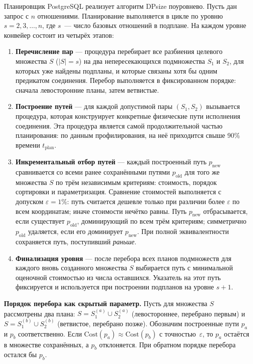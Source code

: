 Планировщик PostgreSQL реализует алгоритм DPsize поуровнево.
Пусть дан запрос с $n$ отношениями. Планирование выполняется в цикле по
уровню $s = 2, 3, \ldots, n$, где $s$~--- число базовых отношений в подплане.
На каждом уровне конвейер состоит из четырёх этапов:
\begin{enumerate}
    \item \textbf{Перечисление пар} --- процедура перебирает все разбиения
    целевого множества $S$ ($|S| = s$) на два непересекающихся подмножества
    $S_1$ и $S_2$, для которых уже найдены подпланы, и которые связаны хотя бы одним
    предикатом соединения. Перебор выполняется в фиксированном порядке:
    сначала левосторонние планы, затем ветвистые.

    \item \textbf{Построение путей} --- для каждой допустимой пары $(S_1, S_2)$
    вызывается процедура, которая конструирует конкретные физические
    пути исполнения соединения. 
    Эта процедура является самой продолжительной частью планирования: по данным профилирования,
    на неё приходится свыше 90\% времени $t_{\mathrm{plan}}$.

    \item \textbf{Инкрементальный отбор путей} --- каждый построенный путь $p_{\text{new}}$
    сравнивается со всеми ранее сохранёнными путями $p_{\text{old}}$ для того же
    множества $S$ по трём независимым критериям: стоимость,
    порядок сортировки и параметризация.
    Сравнение стоимостей выполняется с допуском $\varepsilon = 1\%$: путь считается
    дешевле только при различии более $\varepsilon$ по всем координатам; иначе
    стоимости нечётко равны.
    Путь $p_{\text{new}}$ отбрасывается, если существует $p_{\text{old}}$,
    доминирующий по всем трём критериям; симметрично $p_{\text{old}}$ удаляется,
    если его доминирует $p_{\text{new}}$. При полной эквивалентности сохраняется путь, поступивший \emph{раньше}.

    \item \textbf{Финализация уровня} --- после перебора всех планов подмножеств
    для каждого вновь созданного множества $S$ выбирается путь
    с минимальной оценочной стоимостью из числа оставшихся.
    Указатель на этот путь фиксируется и используется при построении
    подпланов на уровне $s + 1$.
\end{enumerate}
\par

\textbf{Порядок перебора как скрытый параметр.}
Пусть для множества $S$ рассмотрены два плана:
$S = S_1^{(a)} \cup S_2^{(a)}$ (левостороннее, перебрано первым) и
$S = S_1^{(b)} \cup S_2^{(b)}$ (ветвистое, перебрано позже).
Обозначим построенные пути $p_a$ и $p_b$ соответственно.
Если $\mathrm{Cost}(p_a) \approx \mathrm{Cost}(p_b)$ с точностью~$\varepsilon$, то $p_a$
остаётся в множестве сохранённых, а $p_b$ отклоняется.
При обратном порядке перебора остался бы $p_b$.
\par

